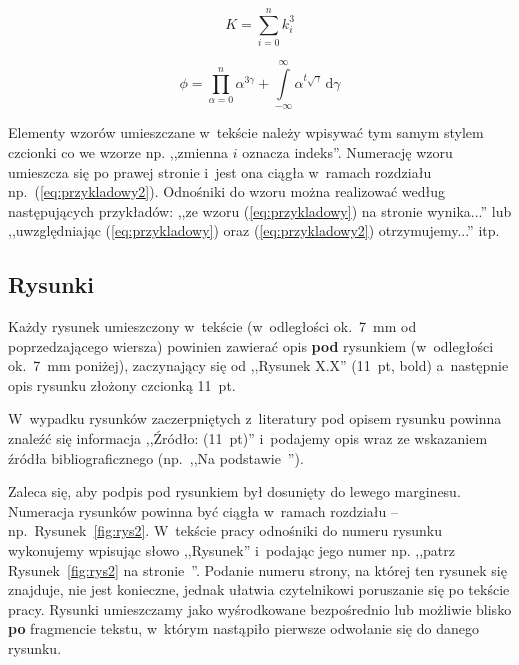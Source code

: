 \documentclass[skorowidz,skroty]{dyplomWEZUT}
\begin{document}

\begin{equation}\label{eq:przykladowy}
	K=\sum_{i=0}^n k_{i}^{3}
\end{equation}

\begin{equation}\label{eq:przykladowy2}
	ϕ=\prod_{α=0}^n α^{3γ} + \int\limits_{-∞}^{∞} \! α^{t\sqrt{γ}} \, \mathup{d}γ
\end{equation}

Elementy wzorów umieszczane w~tekście należy wpisywać tym samym stylem czcionki co we wzorze np. ,,zmienna $i$ oznacza indeks''. Numerację wzoru umieszcza się po prawej stronie i~jest ona ciągła w~ramach rozdziału np.~(\ref{eq:przykladowy2}). Odnośniki do wzoru można realizować według następujących przykładów: ,,ze wzoru (\ref{eq:przykladowy}) na stronie \pageref{eq:przykladowy} wynika...'' lub ,,uwzględniając (\ref{eq:przykladowy}) oraz (\ref{eq:przykladowy2}) otrzymujemy...'' itp.

\subsection{Rysunki}

Każdy rysunek umieszczony w~tekście (w~odległości ok.~7~mm od poprzedzającego wiersza) powinien zawierać opis \textbf{pod} rysunkiem (w~odległości ok.~7~mm poniżej), zaczynający się od ,,Rysunek X.X'' (11~pt, bold) a~następnie opis rysunku złożony czcionką 11~pt.

W~wypadku rysunków zaczerpniętych z~literatury pod opisem rysunku powinna znaleźć się informacja ,,Źródło: (11~pt)'' i~podajemy opis wraz ze wskazaniem źródła bibliograficznego (np.~,,Na podstawie~\cite{Opoka2001}'').

Zaleca się, aby podpis pod rysunkiem był dosunięty do lewego marginesu. Numeracja rysunków powinna być ciągła w~ramach rozdziału -- np.~Rysunek~\ref{fig:rys2}. W~tekście pracy odnośniki do numeru rysunku wykonujemy wpisując słowo ,,Rysunek'' i~podając jego numer np. ,,patrz Rysunek~\ref{fig:rys2} na stronie~\pageref{fig:rys2}''. Podanie numeru strony, na której ten rysunek się znajduje, nie jest konieczne, jednak ułatwia czytelnikowi poruszanie się po tekście pracy. Rysunki umieszczamy jako wyśrodkowane bezpośrednio lub możliwie blisko \textbf{po} fragmencie tekstu, w~którym nastąpiło pierwsze odwołanie się do danego rysunku.
\end{document}
